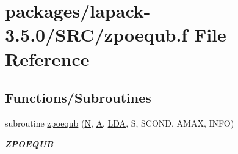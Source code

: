 \hypertarget{zpoequb_8f}{}\section{packages/lapack-\/3.5.0/\+S\+R\+C/zpoequb.f File Reference}
\label{zpoequb_8f}
\subsection*{Functions/\+Subroutines}
\begin{DoxyCompactItemize}
\item 
subroutine \hyperlink{group__complex16POcomputational_ga68eddca8318a41d2ea8c1f3b4f106147}{zpoequb} (\hyperlink{polmisc_8c_a0240ac851181b84ac374872dc5434ee4}{N}, \hyperlink{classA}{A}, \hyperlink{example__user_8c_ae946da542ce0db94dced19b2ecefd1aa}{L\+D\+A}, S, S\+C\+O\+N\+D, A\+M\+A\+X, I\+N\+F\+O)
\begin{DoxyCompactList}\small\item\em {\bfseries Z\+P\+O\+E\+Q\+U\+B} \end{DoxyCompactList}\end{DoxyCompactItemize}
